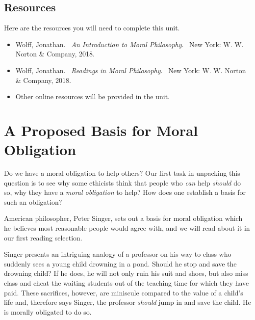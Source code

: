 \documentclass[
]{book}
\providecommand{\tightlist}{%
  \setlength{\itemsep}{0pt}\setlength{\parskip}{0pt}}
\begin{document}
\hypertarget{resources-9}{%
\subsection*{Resources}\label{resources-9}}

Here are the resources you will need to complete this unit.

\begin{itemize}
\tightlist
\item
  Wolff, Jonathan. ~\emph{An Introduction to Moral Philosophy}. ~New York: W. W. Norton \& Company, 2018.\\
\item
  Wolff, Jonathan. ~\emph{Readings in Moral Philosophy}. ~New York: W. W. Norton \& Company, 2018.\\
\item
  Other online resources will be provided in the unit.
\end{itemize}

\hypertarget{a-proposed-basis-for-moral-obligation}{%
\section*{A Proposed Basis for Moral Obligation}\label{a-proposed-basis-for-moral-obligation}}

Do we have a moral obligation to help others? Our first task in unpacking this question is to see why some ethicists think that people who \emph{can} help \emph{should} do so, why they have a \emph{moral obligation} to help? How does one establish a basis for such an obligation?

American philosopher, Peter Singer, sets out a basis for moral obligation which he believes most reasonable people would agree with, and we will read about it in our first reading selection.

Singer presents an intriguing analogy of a professor on his way to class who suddenly sees a young child drowning in a pond. Should he stop and save the drowning child? If he does, he will not only ruin his suit and shoes, but also miss class and cheat the waiting students out of the teaching time for which they have paid. These sacrifices, however, are miniscule compared to the value of a child's life and, therefore says Singer, the professor \emph{should} jump in and save the child. He is morally obligated to do so.
\end{document}
